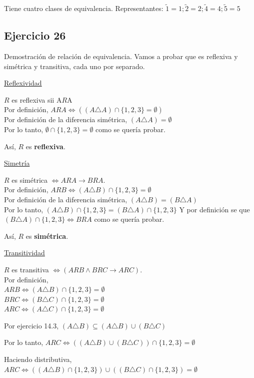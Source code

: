 Tiene cuatro clases de equivalencia. Representantes: $\tilde{1} = 1; \tilde{2} = 2; \tilde{4} = 4; \tilde{5} = 5$

\subsection{Ejercicio 26}
Demostración de relación de equivalencia. Vamos a probar que es reflexiva y simétrica y transitiva, cada uno por separado.

\underline{Reflexividad}

$R$ es reflexiva sii A$R$A \\
Por definición, $ARA \iff ((A \triangle A) \cap \{ 1,2,3 \} = \emptyset) $\\
Por definición de la diferencia simétrica, $(A \triangle A) = \emptyset$ \\
Por lo tanto, $\emptyset \cap \{ 1,2,3 \} = \emptyset$ como se quería probar.

Así, $R$ es \textbf{reflexiva}.

\underline{Simetría}

$R$ es simétrica $\iff ARA \rightarrow BRA$.\\
Por definición, $ARB \iff (A \triangle B) \cap \{ 1,2,3 \} = \emptyset$ \\
Por definición de la diferencia simétrica, $(A \triangle B) = (B \triangle A)$ \\
Por lo tanto, $(A \triangle B) \cap \{ 1,2,3 \} = (B \triangle A) \cap \{ 1,2,3 \}$
Y por definición se que $(B \triangle A) \cap \{ 1,2,3 \} \iff BRA$ como se quería probar.

Así, $R$ es \textbf{simétrica}.

\underline{Transitividad}

$R$ es transitiva $\iff (ARB \wedge BRC \rightarrow ARC)$.\\
Por definición, \\$ARB \iff (A \triangle B) \cap \{ 1,2,3 \} = \emptyset$ \\
                  $BRC \iff (B \triangle C) \cap \{ 1,2,3 \} = \emptyset$ \\
                  $ARC \iff (A \triangle C) \cap \{ 1,2,3 \} = \emptyset$

Por ejercicio 14.3, $(A \triangle B) \subseteq (A \triangle B) \cup (B \triangle C)$

Por lo tanto, $ARC \iff ((A \triangle B) \cup (B \triangle C)) \cap \{ 1,2,3 \} = \emptyset$

Haciendo distributiva, $ARC \iff ((A \triangle B) \cap \{ 1,2,3 \}) \cup ((B \triangle C) \cap \{ 1,2,3 \}) = \emptyset$

